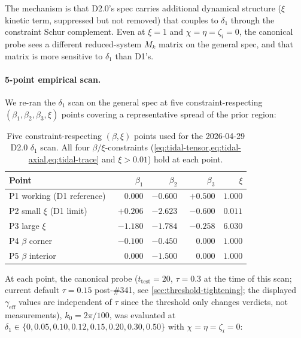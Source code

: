 The mechanism is that D2.0's spec carries additional dynamical structure
($\xi$ kinetic term, suppressed but not removed) that couples to $\delta_1$
through the constraint Schur complement.  Even at $\xi=1$ and $\chi=\eta=\zeta_i=0$,
the canonical probe sees a different reduced-system $M_k$ matrix on the general
spec, and that matrix is more sensitive to $\delta_1$ than D1's.

\paragraph{5-point empirical scan.}
We re-ran the $\delta_1$ scan on the general spec at five constraint-respecting
$(\beta_1, \beta_2, \beta_3, \xi)$ points covering a representative spread of
the prior region:

\begin{table}[h]
\centering
\begin{tabular}{lrrrr}
\toprule
\textbf{Point} & $\beta_1$ & $\beta_2$ & $\beta_3$ & $\xi$ \\
\midrule
P1 working (D1 reference) & $0.000$ & $-0.600$ & $+0.500$ & $1.000$ \\
P2 small $\xi$ (D1 limit) & $+0.206$ & $-2.623$ & $-0.600$ & $0.011$ \\
P3 large $\xi$            & $-1.180$ & $-1.784$ & $-0.258$ & $6.030$ \\
P4 $\beta$ corner         & $-0.100$ & $-0.450$ & $\phantom{+}0.000$ & $1.000$ \\
P5 $\beta$ interior       & $\phantom{+}0.000$ & $-1.500$ & $\phantom{+}0.000$ & $1.000$ \\
\bottomrule
\end{tabular}
\caption{Five constraint-respecting $(\beta,\xi)$ points used for the
2026-04-29 D2.0 $\delta_1$ scan.  All four $\beta/\xi$-constraints
(\cref{eq:tidal-tensor,eq:tidal-axial,eq:tidal-trace} and $\xi>0.01$) hold at
each point.}
\label{tab:d20-scan-points}
\end{table}

At each point, the canonical probe ($t_\mathrm{test}=20$, $\tau=0.3$ at
the time of this scan; current default $\tau=0.15$ post-\#341, see
\cref{sec:threshold-tightening}; the displayed $\gamma_\mathrm{eff}$
values are independent of $\tau$ since the threshold only changes
verdicts, not measurements),
$k_0 = 2\pi/100$, was evaluated at $\delta_1 \in
\{0, 0.05, 0.10, 0.12, 0.15, 0.20, 0.30, 0.50\}$ with $\chi=\eta=\zeta_i=0$:

